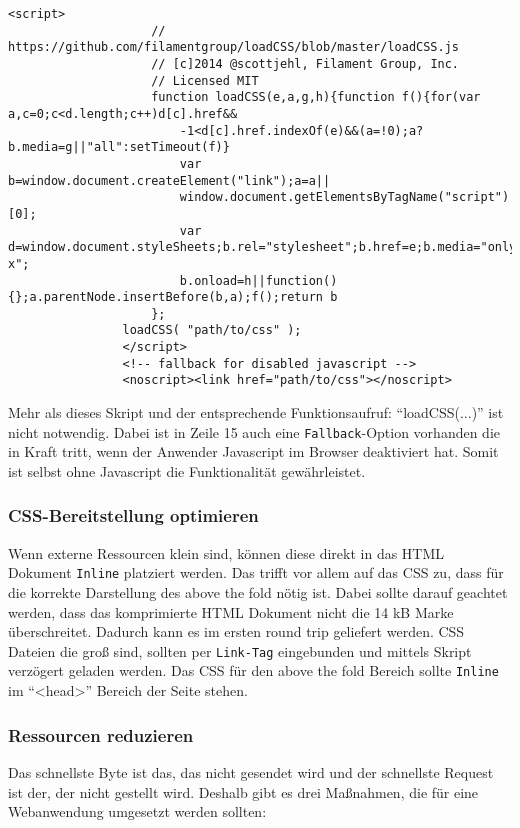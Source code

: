 				\begin{lstlisting}[captionpos=b, caption=Lädt eine CSS Datei asynchron, label=lst:deferCSS, breaklines=false]
				<script>
					// https://github.com/filamentgroup/loadCSS/blob/master/loadCSS.js
					// [c]2014 @scottjehl, Filament Group, Inc.
					// Licensed MIT
		 			function loadCSS(e,a,g,h){function f(){for(var a,c=0;c<d.length;c++)d[c].href&&
		 				-1<d[c].href.indexOf(e)&&(a=!0);a?b.media=g||"all":setTimeout(f)}
		 				var b=window.document.createElement("link");a=a||
		 				window.document.getElementsByTagName("script")[0];
		 				var d=window.document.styleSheets;b.rel="stylesheet";b.href=e;b.media="only x";
		 				b.onload=h||function(){};a.parentNode.insertBefore(b,a);f();return b
		 			};
		  		loadCSS( "path/to/css" );
				</script>
				<!-- fallback for disabled javascript -->
				<noscript><link href="path/to/css"></noscript>
				\end{lstlisting}

				Mehr als dieses Skript und der entsprechende Funktionsaufruf: "`loadCSS(...)"' ist nicht notwendig. Dabei ist in Zeile 15 auch eine \texttt{Fallback}-Option vorhanden die in Kraft tritt, wenn der Anwender Javascript im Browser deaktiviert hat. Somit ist selbst ohne Javascript die Funktionalität gewährleistet.


			\subsubsection{CSS-Bereitstellung optimieren} %
			\label{ssub:css_bereitstellung_optimieren}
				Wenn externe Ressourcen klein sind, können diese direkt in das HTML Dokument \texttt{Inline} platziert werden. Das trifft vor allem auf das CSS zu, dass für die korrekte Darstellung des above the fold nötig ist. Dabei sollte darauf geachtet werden, dass das komprimierte HTML Dokument nicht die 14 kB Marke überschreitet. Dadurch kann es im ersten round trip geliefert werden. CSS Dateien die groß sind, sollten per \texttt{Link-Tag} eingebunden und mittels Skript verzögert geladen werden. Das CSS für den above the fold Bereich sollte \texttt{Inline} im "`<head>"' Bereich der Seite stehen. 


			\subsubsection{Ressourcen reduzieren} %
			\label{ssub:ressourcen_reduzieren}
				Das schnellste Byte ist das, das nicht gesendet wird und der schnellste Request ist der, der nicht gestellt wird. Deshalb gibt es drei Maßnahmen, die für eine Webanwendung umgesetzt werden sollten:

